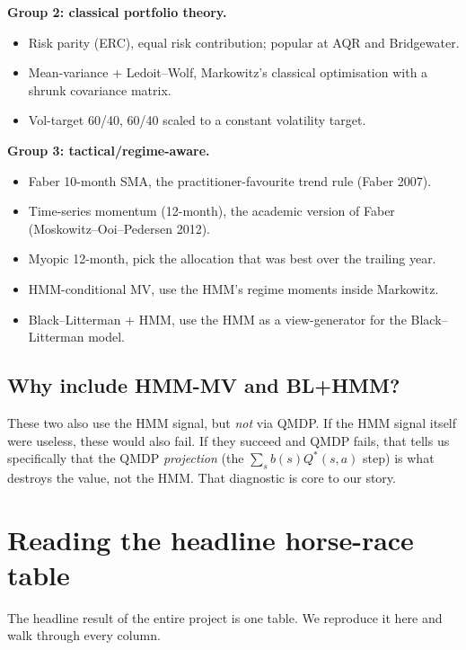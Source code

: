 \documentclass[11pt]{article}
\begin{document}
\textbf{Group 2: classical portfolio theory.}
\begin{itemize}
  \item Risk parity (ERC), equal risk contribution; popular at AQR and Bridgewater.
  \item Mean-variance + Ledoit--Wolf, Markowitz's classical optimisation with a shrunk covariance matrix.
  \item Vol-target 60/40, 60/40 scaled to a constant volatility target.
\end{itemize}

\textbf{Group 3: tactical/regime-aware.}
\begin{itemize}
  \item Faber 10-month SMA, the practitioner-favourite trend rule (Faber 2007).
  \item Time-series momentum (12-month), the academic version of Faber (Moskowitz--Ooi--Pedersen 2012).
  \item Myopic 12-month, pick the allocation that was best over the trailing year.
  \item HMM-conditional MV, use the HMM's regime moments inside Markowitz.
  \item Black--Litterman + HMM, use the HMM as a view-generator for the Black--Litterman model.
\end{itemize}

\subsection{Why include HMM-MV and BL+HMM?}

These two also use the HMM signal, but \emph{not} via QMDP. If the HMM signal itself were useless, these would also fail. If they succeed and QMDP fails, that tells us specifically that the QMDP \emph{projection} (the $\sum_s b(s) Q^*(s, a)$ step) is what destroys the value, not the HMM. That diagnostic is core to our story.

\section{Reading the headline horse-race table}

The headline result of the entire project is one table. We reproduce it here and walk through every column.
\end{document}
